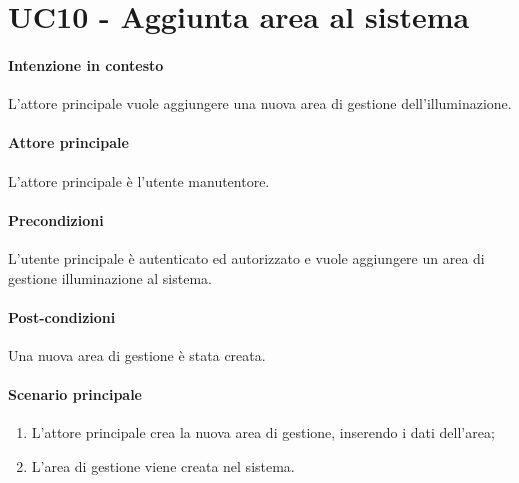 \section{UC10 - Aggiunta area al sistema}\label{uc:10}
\paragraph{Intenzione in contesto} L'attore principale vuole aggiungere una nuova area di gestione dell'illuminazione.

\paragraph{Attore principale} L'attore principale è l'utente manutentore.

\paragraph{Precondizioni} L'utente principale è autenticato ed autorizzato e vuole aggiungere un area di gestione illuminazione al sistema.

\paragraph{Post-condizioni}
Una nuova area di gestione è stata creata.

\paragraph{Scenario principale}
\begin{enumerate}
    \item L'attore principale crea la nuova area di gestione, inserendo i dati dell'area;
    \item L'area di gestione viene creata nel sistema.
\end{enumerate}
